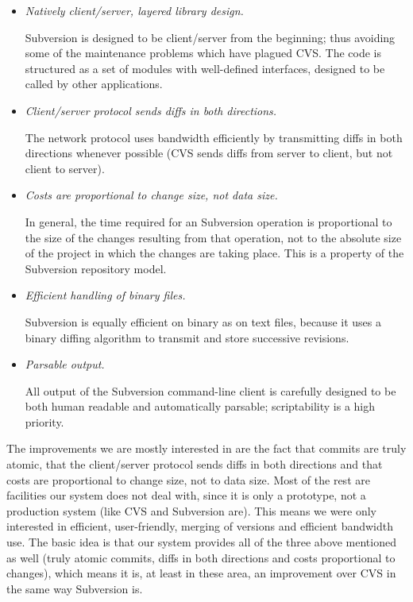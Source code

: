 \begin{itemize}
\item \emph{Natively client/server, layered library design.}

Subversion is designed to be client/server from the beginning; thus avoiding some of the
maintenance problems which have plagued CVS. The code is structured as a set of modules
with well-defined interfaces, designed to be called by other applications.

\item \emph{Client/server protocol sends diffs in both directions.}

The network protocol uses bandwidth efficiently by transmitting diffs in both directions
whenever possible (CVS sends diffs from server to client, but not client to server).

\item \emph{Costs are proportional to change size, not data size.}

In general, the time required for an Subversion operation is proportional to the size of
the changes resulting from that operation, not to the absolute size of the project in
which the changes are taking place. This is a property of the Subversion repository model.

\item \emph{Efficient handling of binary files.}

Subversion is equally efficient on binary as on text files, because it uses a binary
diffing algorithm to transmit and store successive revisions.

\item \emph{Parsable output.}

All output of the Subversion command-line client is carefully designed to be both human
readable and automatically parsable; scriptability is a high priority.

\end{itemize}

The improvements we are mostly interested in are the fact that commits are truly atomic, that
the client/server protocol sends diffs in both directions and that costs are proportional to
change size, not to data size. Most of the rest are facilities our system does not deal with,
since it is only a prototype, not a production system (like CVS and Subversion are). This means
we were only interested in efficient, user-friendly, merging of versions and efficient bandwidth
use. The basic idea is that our system provides all of the three above mentioned as well (truly
atomic commits, diffs in both directions and costs proportional to changes), which means it
is, at least in these area, an improvement over CVS in the same way Subversion is.

